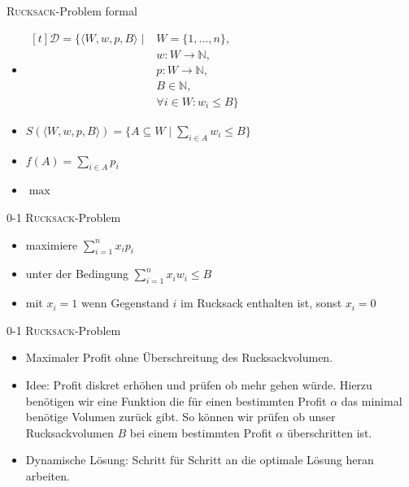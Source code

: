 \begin{frame}{\textsc{Rucksack}-Problem formal}
    \begin{itemize}
        \item $\begin{aligned}[t] \displaystyle
            \mathcal{D}=\{\langle W,w,p,B \rangle \mid & W=\{1,...,n\}, & \\
                                                                & w \colon W \to \mathbb{N}, & \\
                                                                & p \colon W \to \mathbb{N}, & \\
                                                                & B \in \mathbb{N}, & \\
                                                                & \forall i \in W \colon w_i \leq B\}
         \end{aligned}$
        
        \item $\displaystyle S( \langle W, w, p, B \rangle )=\{ A \subseteq W \mid \sum_{i\in A}{ w_i} \leq B \}$
        \item $\displaystyle f(A)=\sum_{i\in A}{p_i}$
        \item $\displaystyle \max$
    \end{itemize}
\end{frame}
\begin{frame}{0-1 \textsc{Rucksack}-Problem}
\begin{itemize}
	\item maximiere $\displaystyle \sum_{i=1}^{n}{x_i p_i}$
       
    \item unter der Bedingung $\displaystyle \sum_{i=1}^{n}{x_i w_i \leq B}$
       
     \item mit $x_i=1$ wenn Gegenstand $i$ im Rucksack enthalten ist, sonst $x_i=0$
\end{itemize}
\end{frame}
\begin{frame}{0-1 \textsc{Rucksack}-Problem}
\begin{itemize}
	\item Maximaler Profit ohne Überschreitung des Rucksackvolumen.
    \item Idee: Profit diskret erhöhen und prüfen ob mehr gehen würde.
    Hierzu benötigen wir eine Funktion die für einen bestimmten Profit $\alpha$ das minimal benötige Volumen zurück gibt.
    So können wir prüfen ob unser Rucksackvolumen $B$ bei einem bestimmten Profit $\alpha$ überschritten ist.
    
    \item Dynamische Lösung: Schritt für Schritt an die optimale Lösung heran arbeiten.
\end{itemize}
\end{frame}
